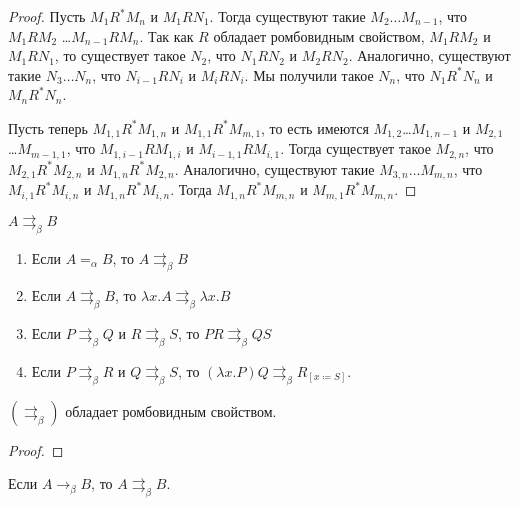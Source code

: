\begin{proof}
    Пусть $M_1 R^{*} M_n$ и $M_1 R N_1$. Тогда существуют такие $M_2 \ldots M_{n-1}$, что $M_1 R M_2$ \ldots $M_{n-1} R M_n$.
    Так как $R$ обладает ромбовидным свойством, $M_1 R M_2$ и $M_1 R N_1$, то существует такое $N_2$,
    что $N_1 R N_2$ и $M_2 R N_2$. Аналогично, существуют такие $N_3 \ldots N_n$, что $N_{i-1} R N_{i}$ и $M_i R N_i$.
    Мы получили такое $N_n$, что $N_1 R^{*} N_n$ и $M_n R^{*} N_n$.

    Пусть теперь $M_{1,1}R^{*}M_{1,n}$ и $M_{1,1}R^{*}M_{m,1}$, то есть имеются $M_{1,2}$\ldots$M_{1,n-1}$ и $M_{2,1}$\ldots$M_{m-1,1}$,
    что $M_{1,i-1} R M_{1,i}$ и $M_{i-1, 1} R M_{i, 1}$.
    Тогда существует такое $M_{2,n}$, что $M_{2,1} R^{*} M_{2,n}$ и $M_{1,n} R^{*} M_{2,n}$.
    Аналогично, существуют такие $M_{3,n}\ldots M_{m,n}$, что $M_{i,1} R^{*} M_{i,n}$ и $M_{1,n} R^{*} M_{i,n}$.
    Тогда $M_{1,n} R^{*} M_{m,n}$ и $M_{m,1} R^{*} M_{m,n}$.
\end{proof}

\begin{definition}
    $A \rightrightarrows_{\beta} B$
    \begin{enumerate}
        \item Если $A =_\alpha B$, то $A \rightrightarrows_{\beta}B$
        \item Если $A \rightrightarrows_{\beta} B$, то $\lambda x.A \rightrightarrows_{\beta} \lambda x . B$
        \item Если $P \rightrightarrows_{\beta} Q$ и $R \rightrightarrows_{\beta} S$, то $PR \rightrightarrows_{\beta} QS$
        \item Если $P \rightrightarrows_{\beta}R$ и $Q \rightrightarrows_{\beta} S$,
            то $(\lambda x . P) Q \rightrightarrows_{\beta} R_{[x\coloneqq{}S]}$.
    \end{enumerate}
\end{definition}

\begin{statement} \label{st-star}
    $(\rightrightarrows_{\beta})$ обладает ромбовидным свойством.
\end{statement}

\begin{proof}
    \todo %
\end{proof}

\begin{statement} \label{st-A}
    Если $A \rightarrow_{\beta} B$, то $A \rightrightarrows_{\beta} B$.
\end{statement}

